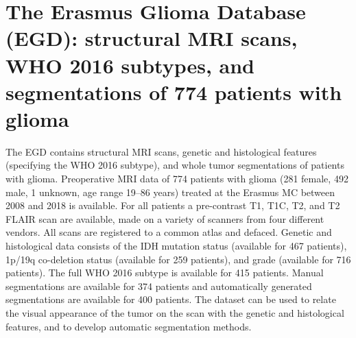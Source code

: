 
{
\chapter[The Erasmus Glioma Database (EGD): structural MRI scans, WHO 2016 subtypes, and segmentations of 774 patients with glioma][Erasmus Glioma Database]{The Erasmus Glioma Database (EGD): structural MRI scans, WHO 2016 subtypes, and segmentations of 774 patients with glioma}\label{chap:EGD}}


\begin{ChapterAbstract}
The \gls{EGD} contains structural \gls{MRI} scans, genetic and histological features (specifying the \acrshort{WHO} 2016 subtype), and whole \gls{tumor} segmentations of patients with glioma.
Preoperative \gls{MRI} data of 774 patients with glioma (281 female, 492 male, 1 unknown, age range 19--86 years) treated at the Erasmus MC between 2008 and 2018 is available.
For all patients a pre-contrast \acrlong{T1}, \acrlong{T1C}, \acrlong{T2}, and \acrlong{T2} FLAIR scan are available, made on a variety of scanners from four different vendors.
All scans are registered to a common atlas and defaced.
Genetic and histological data consists of the \acrshort{IDH} mutation status (available for 467 patients), 1p/19q co-deletion status (available for 259 patients), and grade (available for 716 patients).
The full \acrshort{WHO} 2016 subtype is available for 415 patients.
Manual segmentations are available for 374 patients and automatically generated segmentations are available for 400 patients.
The dataset can be used to relate the visual appearance of the \gls{tumor} on the scan with the genetic and histological features, and to develop automatic segmentation methods.
\end{ChapterAbstract}

